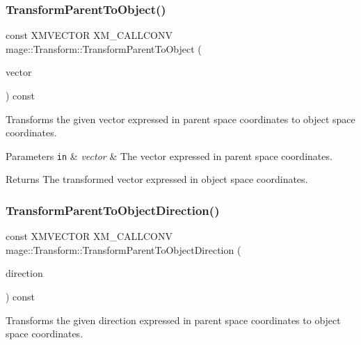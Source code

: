 \subsubsection{\texorpdfstring{Transform\+Parent\+To\+Object()}{TransformParentToObject()}}
{\footnotesize\ttfamily const X\+M\+V\+E\+C\+T\+OR X\+M\+\_\+\+C\+A\+L\+L\+C\+O\+NV mage\+::\+Transform\+::\+Transform\+Parent\+To\+Object (\begin{DoxyParamCaption}\item[{F\+X\+M\+V\+E\+C\+T\+OR}]{vector }\end{DoxyParamCaption}) const\hspace{0.3cm}{\ttfamily [noexcept]}}

Transforms the given vector expressed in parent space coordinates to object space coordinates.


\begin{DoxyParams}[1]{Parameters}
\mbox{\tt in}  & {\em vector} & The vector expressed in parent space coordinates. \\
\hline
\end{DoxyParams}
\begin{DoxyReturn}{Returns}
The transformed vector expressed in object space coordinates. 
\end{DoxyReturn}
\hypertarget{structmage_1_1_transform_a0f84d13bf0016a6c98d84ccf0d357b50}{}\label{structmage_1_1_transform_a0f84d13bf0016a6c98d84ccf0d357b50} 
\subsubsection{\texorpdfstring{Transform\+Parent\+To\+Object\+Direction()}{TransformParentToObjectDirection()}}
{\footnotesize\ttfamily const X\+M\+V\+E\+C\+T\+OR X\+M\+\_\+\+C\+A\+L\+L\+C\+O\+NV mage\+::\+Transform\+::\+Transform\+Parent\+To\+Object\+Direction (\begin{DoxyParamCaption}\item[{F\+X\+M\+V\+E\+C\+T\+OR}]{direction }\end{DoxyParamCaption}) const\hspace{0.3cm}{\ttfamily [noexcept]}}

Transforms the given direction expressed in parent space coordinates to object space coordinates.



